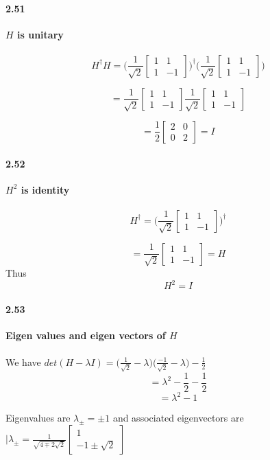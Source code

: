 \paragraph{2.51} \textbf{$H$ is unitary}%
\\
\\

$$ H^{\dagger}H = \bigg( \frac{1}{\sqrt{2}}  \begin{bmatrix}
    1 & 1 \\ 1 & -1
\end{bmatrix}\bigg)^{\dagger}  \bigg( \frac{1}{\sqrt{2}}  \begin{bmatrix}
    1 & 1 \\ 1 & -1
\end{bmatrix}\bigg)$$

$$ =   \frac{1}{\sqrt{2}}  \begin{bmatrix}
    1 & 1 \\ 1 & -1
\end{bmatrix}  \frac{1}{\sqrt{2}}  \begin{bmatrix}
    1 & 1 \\ 1 & -1
\end{bmatrix}$$

$$ =  \frac{1}{2}  \begin{bmatrix}
    2 & 0 \\ 0 & 2
\end{bmatrix} = I$$

\paragraph{2.52} \textbf{$H^2$ is identity}%
\\
\\
$$H^{\dagger} =  \bigg( \frac{1}{\sqrt{2}}  \begin{bmatrix}
    1 & 1 \\ 1 & -1
\end{bmatrix}\bigg)^{\dagger}$$

$$ =  \frac{1}{\sqrt{2}}  \begin{bmatrix}
    1 & 1 \\ 1 & -1
\end{bmatrix} = H$$
Thus $$H^2 = I$$

\paragraph{2.53} \textbf{Eigen values and eigen vectors of $H$}%
\\
\\
We have $det(H - \lambda I) = \bigg( \frac{1}{\sqrt{2}} - \lambda\bigg) \bigg( \frac{-1}{\sqrt{2}} - \lambda\bigg) - \frac{1}{2}$
$$ = \lambda^2 - \frac{1}{2} -\frac{1}{2}$$
$$ = \lambda^2 - 1$$

Eigenvalues are $\lambda_{\pm} = \pm 1 $ and associated eigenvectors are $|\lambda_{\pm} = \frac{1}{\sqrt{4 \mp 2 \sqrt{2}}} \begin{bmatrix}
    1 \\ -1 \pm \sqrt{2}
\end{bmatrix}$